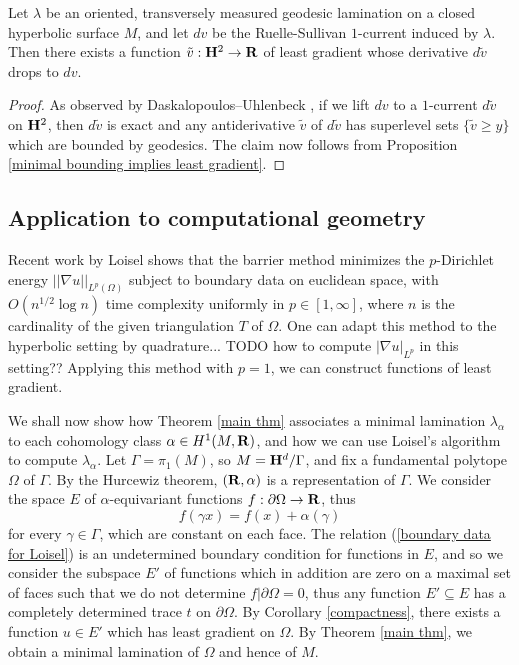 \begin{corollary}\label{ruelle sullivan antiderivative}
Let $\lambda$ be an oriented, transversely measured geodesic lamination on a closed hyperbolic surface $M$, and let $dv$ be the Ruelle-Sullivan $1$-current induced by $\lambda$.
Then there exists a function $\tilde v: \mathbf H^2 \to \mathbf{R}$ of least gradient whose derivative $d\tilde v$ drops to $dv$.
\end{corollary}
\begin{proof}
As observed by Daskalopoulos--Uhlenbeck \cite[\S9]{daskalopoulos2020transverse}, if we lift $dv$ to a $1$-current $d\tilde v$ on $\mathbf H^2$, then $d\tilde v$ is exact and any antiderivative $\tilde v$ of $d\tilde v$ has superlevel sets $\{\tilde v \geq y\}$ which are bounded by geodesics.
The claim now follows from Proposition \ref{minimal bounding implies least gradient}.
\end{proof}


\subsection{Application to computational geometry}
Recent work by Loisel \cite{Loisel20} shows that the barrier method minimizes the $p$-Dirichlet energy $||\nabla u||_{L^p(\Omega)}$
subject to boundary data on euclidean space, with $O(n^{1/2} \log n)$ time complexity uniformly in $p \in [1, \infty]$, where $n$ is the cardinality of the given triangulation $T$ of $\Omega$.
One can adapt this method to the hyperbolic setting by quadrature... TODO how to compute $|\nabla u|_{L^p}$ in this setting??
Applying this method with $p = 1$, we can construct functions of least gradient.

We shall now show how Theorem \ref{main thm} associates a minimal lamination $\lambda_\alpha$ to each cohomology class $\alpha \in H^1(M, \mathbf{R})$, and how we can use Loisel's algorithm to compute $\lambda_\alpha$.
Let $\Gamma = \pi_1(M)$, so $M = \mathbf H^d/\Gamma$, and fix a fundamental polytope $\Omega$ of $\Gamma$.
By the Hurcewiz theorem, $(\mathbf{R}, \alpha)$ is a representation of $\Gamma$.
We consider the space $E$ of $\alpha$-equivariant functions $f: \partial \Omega \to \mathbf{R}$, thus
\begin{equation}\label{boundary data for Loisel}
f(\gamma x) = f(x) + \alpha(\gamma)
\end{equation}
for every $\gamma \in \Gamma$, which are constant on each face.
The relation (\ref{boundary data for Loisel}) is an undetermined boundary condition for functions in $E$, and so we consider the subspace $E'$ of functions which in addition are zero on a maximal set of faces such that we do not determine $f|\partial \Omega = 0$, thus any function $E' \subseteq E$ has a completely determined trace $t$ on $\partial \Omega$.
By Corollary \ref{compactness}, there exists a function $u \in E'$ which has least gradient on $\Omega$.
By Theorem \ref{main thm}, we obtain a minimal lamination of $\Omega$ and hence of $M$.

